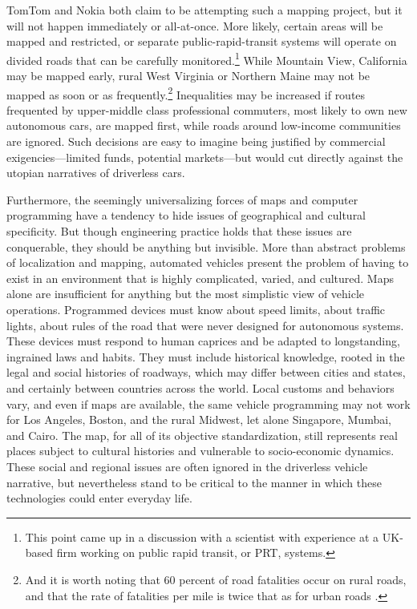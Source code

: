 TomTom \cite{tomtommaps} and Nokia \cite{ubergizmo} both claim to be attempting such
a mapping project,
but it will not happen immediately or all-at-once. More likely,
certain areas will be 
mapped and restricted, or separate public-rapid-transit
systems will operate on divided roads that can be carefully
monitored.\footnote{This point came up in a discussion with a
  scientist with experience at a UK-based firm working on public
  rapid transit, or PRT, systems.} While
Mountain View, California may be mapped early, rural West Virginia or
Northern Maine may not be mapped as soon or as
frequently.\footnote{And it is worth noting that 60 percent of road
  fatalities occur on rural roads, and that the rate of fatalities per
mile is twice that as for urban roads \cite[p. 11]{broviakCars}.}
Inequalities may be increased if routes frequented by upper-middle
class professional commuters, most likely to own new autonomous cars,
are mapped first, while roads around low-income communities are
ignored. Such decisions are easy to imagine being justified by
commercial exigencies---limited funds, potential markets---but would
cut directly against the utopian narratives of driverless cars.

Furthermore, the seemingly universalizing forces of maps and computer programming
have a tendency to hide issues of geographical and cultural
specificity.
But though engineering practice holds that these issues are
conquerable, they should be anything but invisible. More than
abstract problems of localization and mapping, automated vehicles
present the problem of having to exist in an environment that is
highly complicated, varied, and cultured. Maps alone are insufficient
for anything but the most simplistic view of vehicle operations.
Programmed devices
must know about speed limits, about traffic
lights, about rules of the road that were never designed for
autonomous systems. These devices must respond to human caprices and
be adapted to longstanding, ingrained laws and habits. They must
include historical knowledge, rooted in the legal and social histories
of roadways, which may differ between cities and states, and certainly
between countries across the world. Local customs and behaviors vary,
and even if maps are 
available, the same vehicle programming may not work for Los Angeles,
Boston, and the rural Midwest, let alone Singapore, Mumbai, and Cairo.
The map, for all of its objective standardization, still represents
real places subject to cultural histories and vulnerable to
socio-economic dynamics. These social and regional issues are often
ignored in the driverless vehicle narrative, but nevertheless stand to
be critical to the manner in which these technologies could
enter everyday life.



